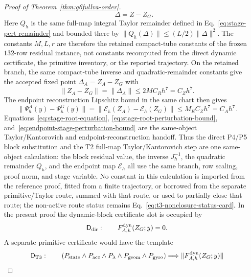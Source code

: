 \documentclass[preprint,12pt]{elsarticle}
\begin{document}
\begin{proof}[Proof of Theorem~\ref{thm:g6fullva-order}]
\begin{equation}
  \qquad \Delta=Z-Z_G .
\end{equation}
Here \(Q_h\) is the same full-map integral Taylor remainder defined in
Eq.~\eqref{eq:stage-pert-remainder} and bounded there by
\(\|Q_h(\Delta)\|\le (L/2)\|\Delta\|^2\).  The constants
\(M,L,r\) are therefore the retained compact-tube constants of the frozen
\(132\)-row residual instance, not constants recomputed from the direct
dynamic certificate, the primitive inventory, or the reported trajectory.
On the retained branch, the same compact-tube inverse and quadratic-remainder
constants give the accepted fixed point \(\Delta_A=Z_A-Z_G\) with
\begin{equation}
\label{eq:stage-root-perturbation-bound}
  \|Z_A-Z_G\|=\|\Delta_A\|\le 2MC_Rh^7=C_Zh^7 .
\end{equation}
The endpoint reconstruction Lipschitz bound in the same chart then gives
\begin{equation}
\label{eq:endpoint-stage-perturbation-bound}
  \|\Psi_h^A(y)-\Psi_h^G(y)\|
  =\|\mathcal E_h(Z_A)-\mathcal E_h(Z_G)\|
  \le M_EC_Zh^7=C_Ah^7 .
\end{equation}
Equations~\eqref{eq:stage-root-equation},
\eqref{eq:stage-root-perturbation-bound},
and~\eqref{eq:endpoint-stage-perturbation-bound} are the same-object
Taylor/Kantorovich and endpoint-reconstruction handoff.
Thus the direct P4/P5 block substitution and the T2 full-map
Taylor/Kantorovich step are one same-object calculation: the block residual
value, the inverse \(J_h^{-1}\), the quadratic remainder \(Q_h\), and the
endpoint map \(\mathcal E_h\) all use the same branch, row scaling, proof
norm, and stage variable.  No constant in this calculation is imported from
the reference proof, fitted from a finite trajectory, or borrowed from the
separate primitive/Taylor route, summed with that route, or used to partially
close that route; the non-active route status remains
Eq.~\eqref{eq:t3-nonclosure-status-card}.
In the present proof the dynamic-block certificate slot is occupied by
\begin{equation}
\label{eq:direct-dynamic-certificate}
  \mathsf{D}_{\rm dir}:\qquad
  F^{\rm dyn}_{A,h}(Z_G;y)=0 .
\end{equation}
A separate primitive certificate would have the template
\begin{equation}
\label{eq:t3-dynamic-certificate-template}
  \mathsf{D}_{\rm T3}:\qquad
  (P_{\mathrm{state}}\wedge P_{\mathrm{acc}}\wedge P_{\lambda}
   \wedge P_{\mathrm{geom}}\wedge P_{\mathrm{gyro}})
  \Longrightarrow
  \|F^{\rm dyn}_{A,h}(Z_G;y)\|

\end{equation}
\end{proof}
\end{document}
